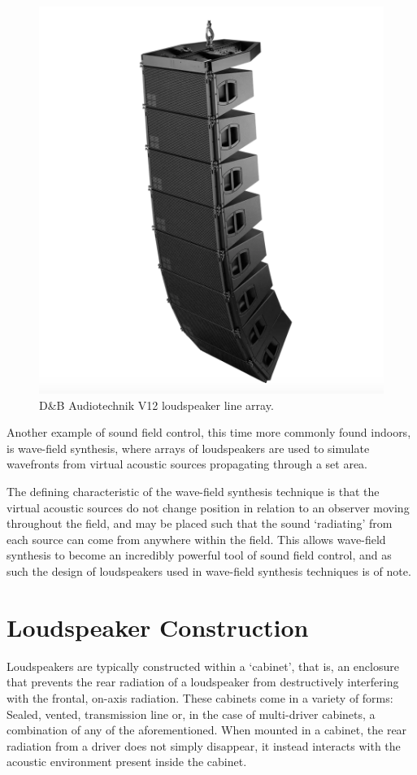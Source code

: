 \documentclass{report}
\begin{document}
        \begin{figure}[H]
            \centering
            \includegraphics[width = 0.4\linewidth]{figs/dbAudiotechnik.png}
            \caption{D\&B Audiotechnik V12 loudspeaker line array.}
            \label{dbAudiotechnik}
        \end{figure}

        Another example of sound field control, this time more commonly found indoors, is wave-field synthesis, where arrays of loudspeakers are used to simulate wavefronts from virtual acoustic sources propagating through a set area.

        The defining characteristic of the wave-field synthesis technique is that the virtual acoustic sources do not change position in relation to an observer moving throughout the field, and may be placed such that the sound `radiating' from each source can come from anywhere within the field.
        This allows wave-field synthesis to become an incredibly powerful tool of sound field control, and as such the design of loudspeakers used in wave-field synthesis techniques is of note.


    \section{Loudspeaker Construction}
        Loudspeakers are typically constructed within a `cabinet', that is, an enclosure that prevents the rear radiation of a loudspeaker from destructively interfering with the frontal, on-axis radiation.
        These cabinets come in a variety of forms: Sealed, vented, transmission line or, in the case of multi-driver cabinets, a combination of any of the aforementioned.
        When mounted in a cabinet, the rear radiation from a driver does not simply disappear, it instead interacts with the acoustic environment present inside the cabinet.
\end{document}
